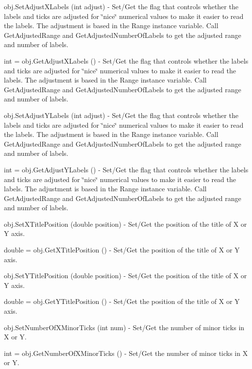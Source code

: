 \begin{DoxyItemize}
\item {\ttfamily obj.\-Set\-Adjust\-X\-Labels (int adjust)} -\/ Set/\-Get the flag that controls whether the labels and ticks are adjusted for \char`\"{}nice\char`\"{} numerical values to make it easier to read the labels. The adjustment is based in the Range instance variable. Call Get\-Adjusted\-Range and Get\-Adjusted\-Number\-Of\-Labels to get the adjusted range and number of labels.  
\item {\ttfamily int = obj.\-Get\-Adjust\-X\-Labels ()} -\/ Set/\-Get the flag that controls whether the labels and ticks are adjusted for \char`\"{}nice\char`\"{} numerical values to make it easier to read the labels. The adjustment is based in the Range instance variable. Call Get\-Adjusted\-Range and Get\-Adjusted\-Number\-Of\-Labels to get the adjusted range and number of labels.  
\item {\ttfamily obj.\-Set\-Adjust\-Y\-Labels (int adjust)} -\/ Set/\-Get the flag that controls whether the labels and ticks are adjusted for \char`\"{}nice\char`\"{} numerical values to make it easier to read the labels. The adjustment is based in the Range instance variable. Call Get\-Adjusted\-Range and Get\-Adjusted\-Number\-Of\-Labels to get the adjusted range and number of labels.  
\item {\ttfamily int = obj.\-Get\-Adjust\-Y\-Labels ()} -\/ Set/\-Get the flag that controls whether the labels and ticks are adjusted for \char`\"{}nice\char`\"{} numerical values to make it easier to read the labels. The adjustment is based in the Range instance variable. Call Get\-Adjusted\-Range and Get\-Adjusted\-Number\-Of\-Labels to get the adjusted range and number of labels.  
\item {\ttfamily obj.\-Set\-X\-Title\-Position (double position)} -\/ Set/\-Get the position of the title of X or Y axis.  
\item {\ttfamily double = obj.\-Get\-X\-Title\-Position ()} -\/ Set/\-Get the position of the title of X or Y axis.  
\item {\ttfamily obj.\-Set\-Y\-Title\-Position (double position)} -\/ Set/\-Get the position of the title of X or Y axis.  
\item {\ttfamily double = obj.\-Get\-Y\-Title\-Position ()} -\/ Set/\-Get the position of the title of X or Y axis.  
\item {\ttfamily obj.\-Set\-Number\-Of\-X\-Minor\-Ticks (int num)} -\/ Set/\-Get the number of minor ticks in X or Y.  
\item {\ttfamily int = obj.\-Get\-Number\-Of\-X\-Minor\-Ticks ()} -\/ Set/\-Get the number of minor ticks in X or Y.  

\end{DoxyItemize}
